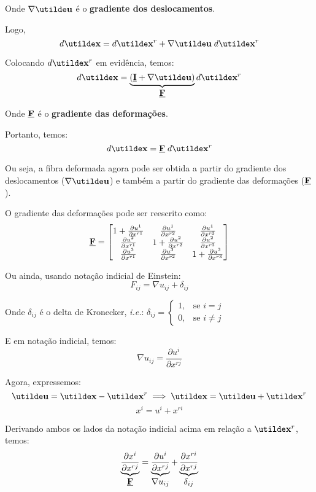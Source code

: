Onde $\nabla\vt{u}$ é o \textbf{gradiente dos deslocamentos}.
	
Logo,
\[d\vt{x}=d\vt{x}^r+\nabla\vt{u}\;d\vt{x}^r\]
	
Colocando $d\vt{x}^r$ em evidência, temos:
\[d\vt{x}=\underbrace{(\underline{\mathbf{I}}+\nabla\vt{u})}_{\displaystyle \ts{F}}d\vt{x}^r\]
	
Onde $\underline{\mathbf{F}}$ é o \textbf{gradiente das deformações}.
	
Portanto, temos:
\begin{equation}
	d\vt{x}=\ts{F}\;d\vt{x}^r
\end{equation}
	
Ou seja, a fibra deformada agora pode ser obtida a partir do gradiente dos deslocamentos ($\nabla\vt{u}$) e também a partir do gradiente das deformações ($\underline{\mathbf{F}}$).
	
O gradiente das deformações pode ser reescrito como:
\[
	\underline{\mathbf{F}}=
	\begin{bmatrix}
		1+\frac{\partial u^1}{\partial x^{r1}} & \frac{\partial u^1}{\partial x^{r2}} & \frac{\partial u^1}{\partial x^{r3}} \\
		\frac{\partial u^2}{\partial x^{r1}} & 1+\frac{\partial u^2}{\partial x^{r2}} & \frac{\partial u^2}{\partial x^{r3}} \\
		\frac{\partial u^3}{\partial x^{r1}} & \frac{\partial u^3}{\partial x^{r2}} & 1+\frac{\partial u^3}{\partial x^{r3}}
	\end{bmatrix}
\]
	
Ou ainda, usando notação indicial de Einstein:
\[F_{ij}=\nabla u_{ij}+\delta_{ij}\]
	
Onde $\delta_{ij}$ é o delta de Kronecker, \textit{i.e.}: $\delta_{ij}=\begin{cases} 1, & \text{se } i=j \\ 0, & \text{se } i\neq j \end{cases}$
	
E em notação indicial, temos:
\[\nabla u_{ij}=\frac{\partial u^i}{\partial x^{rj}}\]
	
Agora, expressemos:
\[\vt{u}=\vt{x}-\vt{x}^r\implies \vt{x}=\vt{u}+\vt{x}^r\]
\[x^i=u^i+x^{ri}\]
	
Derivando ambos os lados da notação indicial acima em relação a $\vt{x}^r$, temos:
\[\underbrace{\frac{\partial x^i}{\partial x^{rj}}}_{\displaystyle\underline{\mathbf{F}}}=\underbrace{\frac{\partial u^i}{\partial x^{rj}}}_{\displaystyle\nabla u_{ij}}+\underbrace{\frac{\partial x^{ri}}{\partial x^{rj}}}_{\displaystyle\delta_{ij}}\]
	
